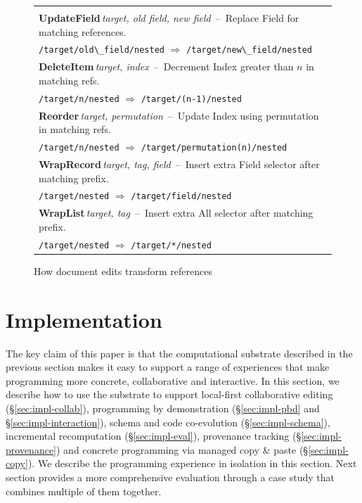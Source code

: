 \documentclass[sigconf]{acmart}
\begin{document}
\begin{figure}
\newcommand{\tttablecol}[5]{
\small{\bfseries #1}\;\,\footnotesize\textit{#2}\,\; --\,\; #5\\[-0.1em]
\quad \footnotesize #3 \;\;$\Rightarrow$\;\; #4 \\[0.3em]
}
\begin{tabular}{|l|}
\hline
\\[-1em]
\tttablecol{UpdateField}{target, old field, new field}{\Verb|/target/old\_field/nested|}{\Verb|/target/new\_field/nested|}
  {Replace Field for matching references.}
\tttablecol{DeleteItem}{target, index}{\Verb|/target/n/nested|}{\Verb|/target/(n-1)/nested|}
  {Decrement Index greater than $n$ in matching refs.}
\tttablecol{Reorder}{target, permutation}{\Verb|/target/n/nested|}{\Verb|/target/permutation(n)/nested|}
  {Update Index using permutation in matching refs.}
\tttablecol{WrapRecord}{target, tag, field}{\Verb|/target/nested|}{\Verb|/target/field/nested|}
  {Insert extra Field selector after matching prefix.}
\tttablecol{WrapList}{target, tag}{\Verb|/target/nested|}{\Verb|/target/*/nested|}
  {Insert extra All selector after matching prefix.}
\hline
\end{tabular}
\vspace{-0.5em}
\caption{How document edits transform references}
\label{fig:updates}
\vspace{-1em}
\end{figure}



\section{Implementation}
\label{sec:impl}

The key claim of this paper is that the computational substrate described in the previous
section makes it easy to support a range of experiences that make programming more concrete,
collaborative and interactive. In this section, we describe how to use the substrate to support
local-first collaborative editing (\S\ref{sec:impl-collab}), programming by
demonstration (\S\ref{sec:impl-pbd} and \S\ref{sec:impl-interaction}),
schema and code co-evolution (\S\ref{sec:impl-schema}), incremental recomputation
(\S\ref{sec:impl-eval}), provenance tracking (\S\ref{sec:impl-provenance})
and concrete programming via managed copy \& paste (\S\ref{sec:impl-copy}).
We describe the programming experience in isolation in this section. Next section provides a
more comprehensive evaluation through a case study that combines multiple of them together.
\end{document}
